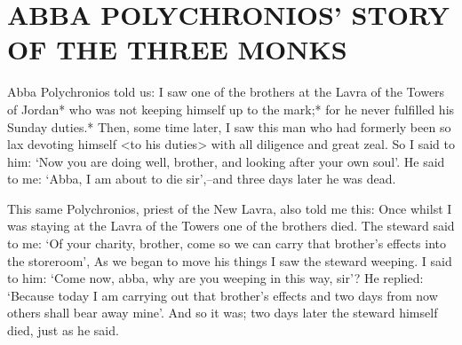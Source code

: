 \chapter{ABBA POLYCHRONIOS' STORY OF THE THREE MONKS}

Abba Polychronios told us: I saw one of the brothers at the Lavra
of the Towers of Jordan* who was not keeping himself up to the mark;*
for he never fulfilled his Sunday duties.*
Then, some time later, I saw this man who had formerly been so lax devoting himself <to his duties> with all diligence and great zeal.
So I said to him: `Now you are doing well, brother, and looking after your own soul'.
He said to me: `Abba, I am about to die sir',--and three days later he was dead.

This same Polychronios, priest of the New Lavra, also told me this: Once whilst I was staying at the Lavra of the Towers one of the brothers died.
The steward said to me: `Of your charity, brother, come so we can carry that brother's effects into the storeroom', As we began to move his things I saw the steward weeping.
I said to him: `Come now, abba, why are you weeping in this way, sir'?
He replied: `Because today I am carrying out that brother's effects and two days from now others shall bear away mine'.
And so it was; two days later the steward himself died, just as he said.

